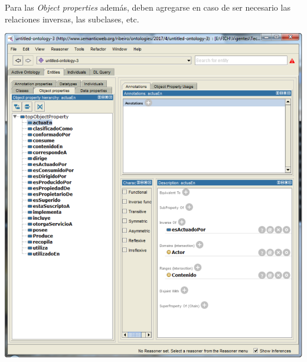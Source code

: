 \documentclass[a4paper,10pt,spanish,oneside]{article}
\begin{document}
\begin{minipage}{0.3\linewidth}

Para las \textit{Object properties} además, deben agregarse en caso de ser necesario las relaciones inversas, las subclases, etc.

\end{minipage} \hfill \begin{minipage}{0.65\linewidth}

\begin{center}
\includegraphics[width=\linewidth]{7}
\end{center}

\end{minipage}
\end{document}
